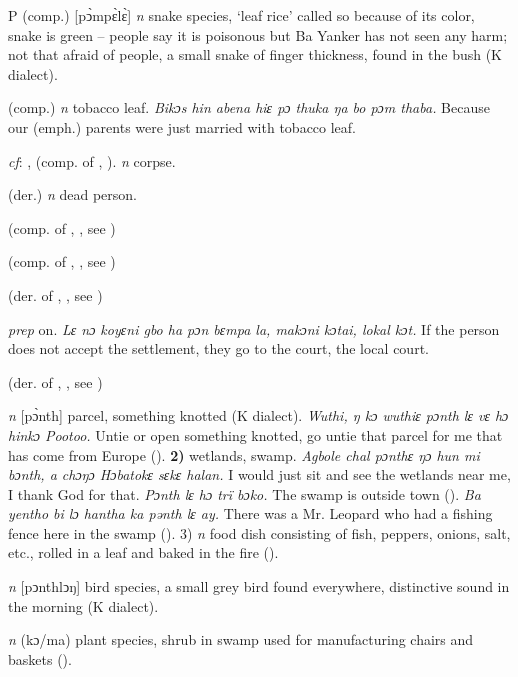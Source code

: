 \begin{letter}{P}
 (comp.) [pͻ̀mpɛ̀lɛ̀] \textit{n} snake species, ‘leaf rice' called so because of its color, snake is green – people say it is poisonous but Ba Yanker has not seen any harm; not that afraid of people, a small snake of finger thickness, found in the bush (K dialect).

 (comp.) \textit{n} tobacco leaf. \textit{Bikɔs hin abena hiɛ pɔ thuka ŋa bo pɔm thaba.} Because our (emph.) parents were just married with tobacco leaf.

 \textit{cf}: ,  (comp. of , ). \textit{n} corpse.

 (der.) \textit{n} dead person.

 (comp. of , , see ) 

 (comp. of , , see ) 

 (der. of , , see ) 

 \textit{prep} on. \textit{Lɛ nɔ koyɛni gbo ha pɔn bɛmpa la, makɔni kɔtai, lokal kɔt.} If the person does not accept the settlement, they go to the court, the local court.

 (der. of , , see ) 

 \textit{n} [pɔ̀nth] parcel, something knotted (K dialect). \textit{Wuthi, ŋ kɔ wuthiɛ pɔnth lɛ vɛ hɔ hinkɔ Pootoo.} Untie or open something knotted, go untie that parcel for me that has come from Europe (\citealt{Pichl1967}). \textbf{2)} wetlands, swamp. \textit{Agbole chal pɔnthɛ ŋɔ hun mi bɔnth, a chɔŋɔ Hɔbatokɛ sɛkɛ halan.} I would just sit and see the wetlands near me, I thank God for that. \textit{Pɔnth lɛ hɔ trï bɔko.} The swamp is outside town (\citealt{Pichl1967}). \textit{Ba yentho bi lɔ hantha ka pənth lɛ ay.} There was a Mr. Leopard who had a fishing fence here in the swamp (\citealt{Pichl1967}). 3) \textit{n} food dish consisting of fish, peppers, onions, salt, etc., rolled in a leaf and baked in the fire (\citealt{Pichl1967}).

 \textit{n} [pͻnthlͻŋ] bird species, a small grey bird found everywhere, distinctive sound in the morning (K dialect).

 \textit{n} (kɔ/ma) plant species, shrub in swamp used for manufacturing chairs and baskets (\citealt{Pichl1967}). 


\end{letter}
